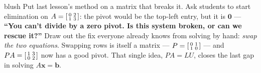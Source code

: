 \documentclass[10pt]{article}
\newcommand{\xx}{\mathbf{x}}
\newcommand{\bb}{\mathbf{b}}
\newcommand{\PP}{P}
\begin{document}
\begin{skillbox}[Hook]{blush}
    Put last lesson's method on a matrix that breaks it. Ask students to start elimination on
    $A=\begin{bsmallmatrix} 0&2\\1&3 \end{bsmallmatrix}$: the pivot would be the top-left entry, but it is
    $\mathbf{0}$ --- \textbf{``You can't divide by a zero pivot. Is this system broken, or can we
    rescue it?''} Draw out the fix everyone already knows from solving by hand: \emph{swap the two
    equations}. Swapping rows is itself a matrix --- $\PP=\begin{bsmallmatrix} 0&1\\1&0 \end{bsmallmatrix}$ ---
    and $\PP A=\begin{bsmallmatrix} 1&3\\0&2 \end{bsmallmatrix}$ now has a good pivot. That single idea,
    $\PP A=LU$, closes the last gap in solving $A\xx=\bb$.
\end{skillbox}
\end{document}

